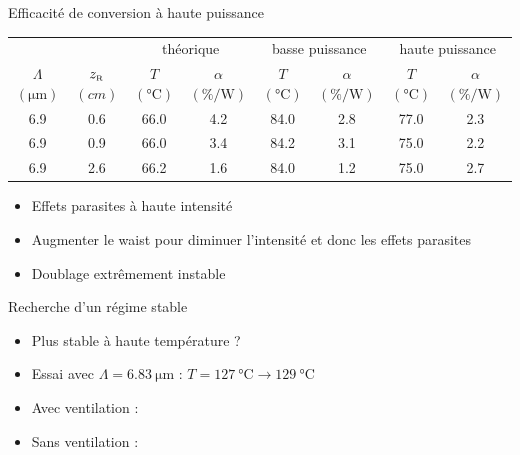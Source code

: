 \documentclass{beamer}
\newcommand{\zr}{z_\mathsc{R}}
\begin{document}
\begin{frame}{Efficacité de conversion à haute puissance}

\small
\setlength{\tabcolsep}{2.3pt}
\hspace*{-0.5cm}
\begin{tabular}{@{}cccccccc@{}} \toprule
 &  & \multicolumn{2}{c}{théorique} & \multicolumn{2}{c}{basse puissance} & \multicolumn{2}{c}{haute puissance} \\ 
 \cmidrule(r){3-4} \cmidrule(lr){5-6} \cmidrule(l){7-8} 
 $\Lambda$ $(\unit{\micro\meter})$ & $\zr$ $(\unit{cm})$ & $T$ $(\unit{\celsius})$ & $\alpha$ $(\unit{\percent\per\watt})$& $T$ $(\unit{\celsius})$ & $\alpha$ $(\unit{\percent\per\watt})$ & $T$ $(\unit{\celsius})$ & $\alpha$ $(\unit{\percent\per\watt})$   \\ \midrule
 6.9       & 0.6  & 66.0  & 4.2      & 84.0 & 2.8      & 77.0 & 2.3      \\
 6.9       & 0.9  & 66.0  & 3.4      & 84.2 & 3.1      & 75.0 & 2.2      \\
 6.9       & 2.6  & 66.2  & 1.6      & 84.0 & 1.2      & 75.0   & 2.7      \\ \bottomrule 
\end{tabular}
\normalsize
\begin{itemize}[<+->]
\item Effets parasites à haute intensité
\item Augmenter le waist pour diminuer l'intensité et donc les effets parasites
\item Doublage extrêmement instable
\end{itemize}
\end{frame}

\begin{frame}{Recherche d'un régime stable}
\begin{itemize}
\item Plus stable à haute température ? \pause
\item Essai avec $\Lambda=\SI{6.83}{\micro\meter}$ : $T = \SI{127}{\celsius} \rightarrow \SI{129}{\celsius}$ \pause
\item Avec ventilation :
\vspace*{-0.2cm} \hspace*{-0.5cm}
\begin{figure}
	\centering
	
\end{figure}
\vspace*{-1cm} \pause
\item Sans ventilation :
\vspace*{-0.2cm} \hspace*{-0.5cm}
\begin{figure}
	\centering
	
\end{figure}
\end{itemize}
\end{frame}
\end{document}
